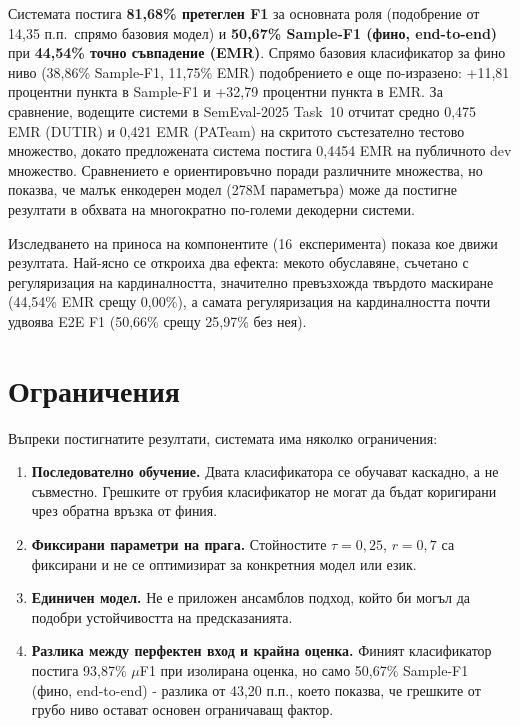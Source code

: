 \documentclass[12pt,a4paper]{report}
\begin{document}
Системата постига \textbf{81,68\% претеглен F1} за основната роля (подобрение от 14,35 п.п.\ спрямо базовия модел) и \textbf{50,67\% Sample-F1 (фино, end-to-end)} при \textbf{44,54\% точно съвпадение (EMR)}. Спрямо базовия класификатор за фино ниво (38,86\% Sample-F1, 11,75\% EMR) подобрението е още по-изразено: +11,81 процентни пункта в Sample-F1 и +32,79 процентни пункта в EMR. За сравнение, водещите системи в SemEval-2025 Task~10 отчитат средно 0,475 EMR (DUTIR) и 0,421 EMR (PATeam) на скритото състезателно тестово множество, докато предложената система постига 0,4454 EMR на публичното dev множество. Сравнението е ориентировъчно поради различните множества, но показва, че малък енкодерен модел (278M параметъра) може да постигне резултати в обхвата на многократно по-големи декодерни системи.

Изследването на приноса на компонентите (16~експеримента) показа кое движи резултата. Най-ясно се откроиха два ефекта: мекото обуславяне, съчетано с регуляризация на кардиналността, значително превъзхожда твърдото маскиране (44,54\% EMR срещу 0,00\%), а самата регуляризация на кардиналността почти удвоява E2E F1 (50,66\% срещу 25,97\% без нея).

\section{Ограничения}

Въпреки постигнатите резултати, системата има няколко ограничения:

\begin{enumerate}
  \item \textbf{Последователно обучение.} Двата класификатора се обучават каскадно, а не съвместно. Грешките от грубия класификатор не могат да бъдат коригирани чрез обратна връзка от финия.
  \item \textbf{Фиксирани параметри на прага.} Стойностите $\tau=0{,}25$, $r=0{,}7$ са фиксирани и не се оптимизират за конкретния модел или език.
  \item \textbf{Единичен модел.} Не е приложен ансамблов подход, който би могъл да подобри устойчивостта на предсказанията.
  \item \textbf{Разлика между перфектен вход и крайна оценка.} Финият класификатор постига 93,87\% $\mu$F1 при изолирана оценка, но само 50,67\% Sample-F1 (фино, end-to-end) - разлика от 43,20 п.п., което показва, че грешките от грубо ниво остават основен ограничаващ фактор.
\end{enumerate}
\end{document}
